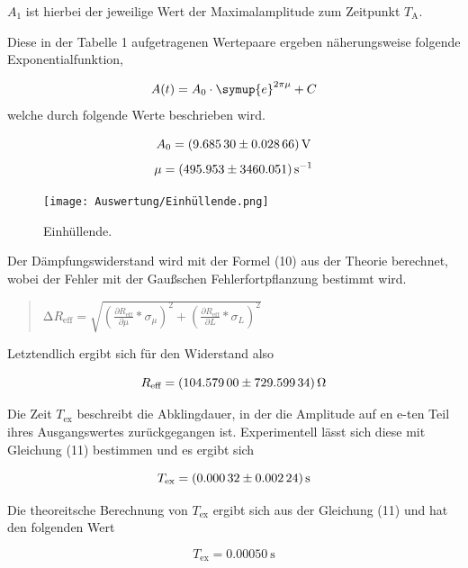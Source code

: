 $A_1$ ist hierbei der jeweilige Wert der Maximalamplitude zum Zeitpunkt $T_\text{A}$.

Diese in der Tabelle 1 aufgetragenen Wertepaare ergeben näherungsweise folgende Exponentialfunktion,

\begin{equation}
	{A(t)} = {A_0} \cdot \symup{e}^ {2\pi\mu} + {C}
\end{equation}
\newpage
welche durch folgende Werte beschrieben wird.

\begin{equation}
	{A_0} = \SI{9.6853 \pm 0.02866}{\volt}
\end{equation}
\begin{equation}
	{\mu} = \SI{495.953 \pm 3460.051}{\per\second}
\end{equation}

\begin{figure}[H]
  \centering
  \texttt{[image: Auswertung/Einhüllende.png]}
  \caption{Einhüllende.}
  \label{fig:1}
\end{figure}

Der Dämpfungswiderstand wird mit der Formel (10) aus der Theorie berechnet, wobei der Fehler mit der Gaußschen Fehlerfortpflanzung bestimmt wird.

\begin{quote}
$\increment R_\text{eff} = \sqrt{(\frac{\partial R_\text{eff}}{\partial \mu} * \sigma_{\mu})^2 + (\frac{\partial R_\text{eff}}{\partial L} * \sigma_{L})^2}$
\end{quote}

Letztendlich ergibt sich für den Widerstand also

\begin{equation}
	{R_\text{eff}} = \SI{104.579 \pm 729.59934}{\ohm}
\end{equation}

Die Zeit $T_\text{ex}$ beschreibt die Abklingdauer, in der die Amplitude auf en e-ten Teil ihres Ausgangswertes zurückgegangen ist.
Experimentell lässt sich diese mit Gleichung (11) bestimmen und es ergibt sich
 
\begin{equation}
	{T_\text{ex}} = \SI{0.00032 \pm 0.00224}{\s}
\end{equation}

Die theoreitsche Berechnung von $T_\text{ex}$ ergibt sich aus der Gleichung (11) und hat den folgenden Wert

\begin{equation}
	{T_\text{ex}} = \SI{0.00050}{\s}
\end{equation}

